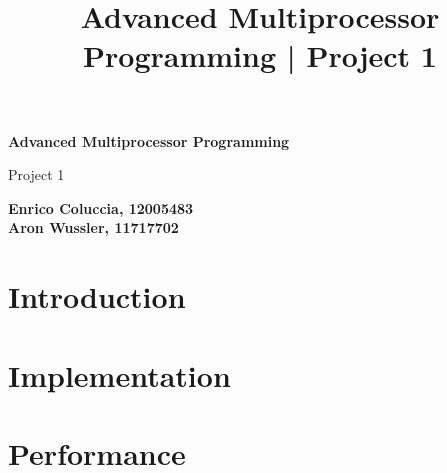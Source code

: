 \documentclass[12pt,a4paper, tikz]{article}
\begin{document}
\title{Advanced Multiprocessor Programming | Project 1}

\begin{titlepage}
    \begin{center}
        \vspace*{1cm}

        \Huge
        \textbf{Advanced Multiprocessor Programming}

        \vspace{0.5cm}
        \LARGE
        Project 1 \\

        \vspace{1.5cm}

        \small
        \textbf{Enrico Coluccia, 12005483\\ Aron Wussler, 11717702}

        \vfill

        \vspace{0.8cm}


    \end{center}
\end{titlepage}

\section{Introduction}


\section{Implementation}


\section{Performance}


\printbibliography
\end{document}
